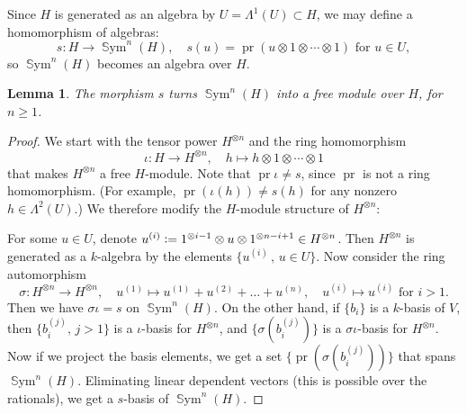 \documentclass{alggeom}
\DeclareMathOperator{\SSym}{\mathbb{S}ym}
\DeclareMathOperator{\pr}{pr}
\newcommand{\defIs}{\vcentcolon=}
\theoremstyle{plain}
\newtheorem{lemma}[theorem]{Lemma}
\theoremstyle{definition}
\theoremstyle{remark}
\begin{document}
Since $H$ is generated as an algebra by $U=\Lambda^1(U)\subset H$, we may define a homomorphism of algebras:
$$ s : H \longrightarrow \SSym^n( H), \quad s(u) = \pr( u \otimes 1\otimes\cdots\otimes 1)\text{ for }u\in U, $$
so $\SSym^n( H)$ becomes an algebra over $H$.
\begin{lemma}
\label{SuperFree}
The morphism $s$ turns $\SSym^n( H)$ into a free module over $H$, for $n\geq 1$.
\end{lemma}
\begin{proof}
We start with the tensor power $H^{\otimes n}$ and the ring homomorphism 
$$
\iota : H \longrightarrow H^{\otimes n},\quad h\longmapsto h\otimes 1\otimes\cdots\otimes 1
$$
that makes $H^{\otimes n}$ a free $H$-module. Note that $\pr \iota \neq s$, since $\pr$ is not a ring homomorphism.
(For example, $\pr(\iota(h))\neq s(h)$ for any nonzero $h\in\Lambda^2(U)$.)
We therefore modify the $H$-module structure of $H^{\otimes n}$:

For some $u\in U$, denote $u^{(i)} \defIs  1^{\otimes i-1}\otimes u\otimes 1^{\otimes n-i+1} \in H^{\otimes n}$. Then $H^{\otimes n}$ is generated as a $k$-algebra by the elements $\{u^{(i)}\,,\,u\in U\}$. Now consider the ring automorphism
$$
\sigma : H^{\otimes n} \longrightarrow H^{\otimes n}, \quad u^{(1)} \longmapsto u^{(1)} +u^{(2)} + \ldots + u^{(n)}, \quad
u^{(i)} \longmapsto u^{(i)} \text{ for } i>1.
$$
Then we have $\sigma\iota = s$ on $\SSym^n( H)$. On the other hand, if $\{b_i\}$ is a $k$-basis of $V$, then $\{b_i^{(j)},\,j>1\} $ is a $\iota$-basis for $H^{\otimes n}$, and $\{\sigma(b_i^{(j)})\}$ is a $\sigma\iota$-basis for $H^{\otimes n}$.
Now if we project the basis elements, we get a set $\{\pr(\sigma(b_i^{(j)}))\}$ that spans $\SSym^n( H)$. Eliminating linear dependent vectors (this is possible over the rationals), we get a $s$-basis of $\SSym^n( H)$.
\end{proof}
\end{document}
